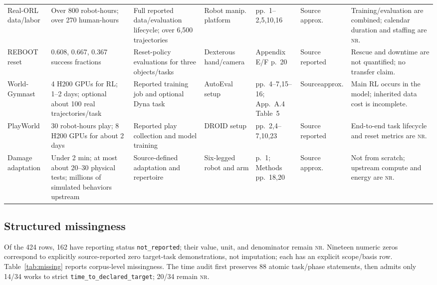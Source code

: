 \documentclass[11pt]{article}
\newcommand{\NR}{\textsc{nr}}
\begin{document}
\begin{longtable}{@{}L{0.11\textwidth}L{0.13\textwidth}L{0.14\textwidth}L{0.11\textwidth}L{0.13\textwidth}L{0.10\textwidth}L{0.18\textwidth}@{}}
\addlinespace
Real-ORL data/labor & Over 800 robot-hours; over 270 human-hours & Full reported data/\linebreak evaluation lifecycle; over 6{,}500 trajectories & Robot manip. platform & pp.~1--2,5,10,16 \cite{zhou2023realorl} & Source approx. & Training/evaluation are combined; calendar duration and staffing are \NR. \\
\addlinespace
REBOOT reset & 0.608, 0.667, 0.367 success fractions & Reset-policy evaluations for three objects/tasks & Dexterous hand/\linebreak camera & Appendix E/F p.~20 \cite{hu2023reboot} & Source reported & Rescue and downtime are not quantified; no transfer claim. \\
\addlinespace
World-Gymnast & 4 H200 GPUs for RL; 1--2 days; optional about 100 real trajectories/task & Reported training job and optional Dyna task & AutoEval setup & pp.~4--7,15--16; App.~A.4 Table~5 \cite{sharma2026worldgymnast} & Source\linebreak approx. & Main RL occurs in the model; inherited data cost is incomplete. \\
\addlinespace
PlayWorld & 30 robot-hours play; 8 H200 GPUs for about 2 days & Reported play collection and model training & DROID setup & pp.~2,4--7,10,23 \cite{yin2026playworld} & Source reported & End-to-end task lifecycle and reset metrics are \NR. \\
\addlinespace
Damage adaptation & Under 2 min; at most about 20--30 physical tests; millions of simulated behaviors upstream & Source-defined adaptation and repertoire & Six-legged robot and arm & p.~1; Methods pp.~18,20 \cite{cully2015adaptanimals} & Source approx. & Not from scratch; upstream compute and energy are \NR. \\
\bottomrule
\end{longtable}
\endgroup

\subsection{Structured missingness}

Of the 424 rows, 162 have reporting status \texttt{not\_reported}; their value, unit, and denominator remain \NR. Nineteen numeric zeros correspond to explicitly source-reported zero target-task demonstrations, not imputation; each has an explicit scope/basis row. Table~\ref{tab:missing} reports corpus-level missingness. The time audit first preserves 88 atomic task/phase statements, then admits only 14/34 works to strict \texttt{time\_to\_declared\_target}; 20/34 remain \NR.
\end{document}
